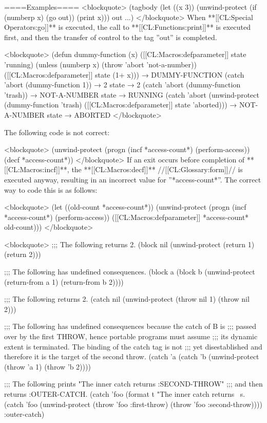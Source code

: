 ====Examples==== <blockquote> (tagbody (let ((x 3)) (unwind-protect (if (numberp x) (go out)) (print x))) out ...) </blockquote> When **[[CL:Special Operators:go]]** is executed, the call to **[[CL:Functions:print]]** is executed first, and then the transfer of control to the tag ''out'' is completed.

<blockquote> (defun dummy-function (x) ([[CL:Macros:defparameter]] state 'running) (unless (numberp x) (throw 'abort 'not-a-number)) ([[CL:Macros:defparameter]] state (1+ x))) → DUMMY-FUNCTION (catch 'abort (dummy-function 1)) → 2 state → 2 (catch 'abort (dummy-function 'trash)) → NOT-A-NUMBER state → RUNNING (catch 'abort (unwind-protect (dummy-function 'trash) ([[CL:Macros:defparameter]] state 'aborted))) → NOT-A-NUMBER state → ABORTED </blockquote>

The following code is not correct:

<blockquote> (unwind-protect (progn (incf *access-count*) (perform-access)) (decf *access-count*)) </blockquote> If an exit occurs before completion of **[[CL:Macros:incf]]**, the **[[CL:Macros:decf]]** //[[CL:Glossary:form]]// is executed anyway, resulting in an incorrect value for ''*access-count*''. The correct way to code this is as follows:

<blockquote> (let ((old-count *access-count*)) (unwind-protect (progn (incf *access-count*) (perform-access)) ([[CL:Macros:defparameter]] *access-count* old-count))) </blockquote>


<blockquote> ;;; The following returns 2. (block nil (unwind-protect (return 1) (return 2)))

;;; The following has undefined consequences. (block a (block b (unwind-protect (return-from a 1) (return-from b 2))))

;;; The following returns 2. (catch nil (unwind-protect (throw nil 1) (throw nil 2)))

;;; The following has undefined consequences because the catch of B is ;;; passed over by the first THROW, hence portable programs must assume ;;; its dynamic extent is terminated. The binding of the catch tag is not ;;; yet disestablished and therefore it is the target of the second throw. (catch 'a (catch 'b (unwind-protect (throw 'a 1) (throw 'b 2))))

;;; The following prints "The inner catch returns :SECOND-THROW" ;;; and then returns :OUTER-CATCH. (catch 'foo (format t "The inner catch returns ~s.~ (catch 'foo (unwind-protect (throw 'foo :first-throw) (throw 'foo :second-throw)))) :outer-catch)



